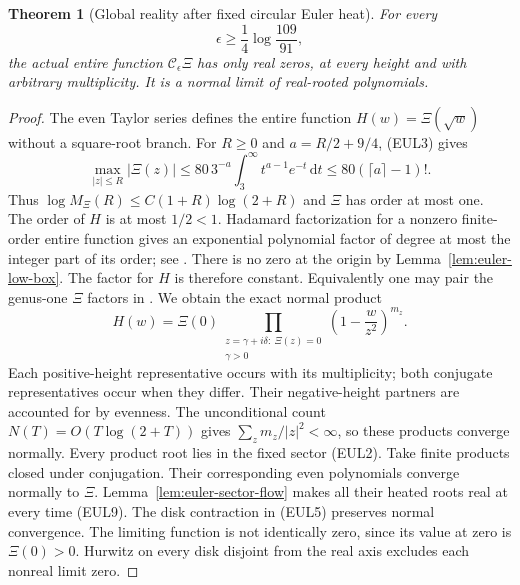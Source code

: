\documentclass[11pt]{article}
\newtheorem{theorem}{Theorem}
\theoremstyle{remark}\newtheorem{remark}[theorem]{Remark}
\newcommand{\dd}{\,\mathrm d}
\begin{document}
\begin{theorem}[Global reality after fixed circular Euler heat]
\label{thm:euler-xi-real}
For every
\[
                  \epsilon\ge\frac14\log\frac{109}{91},  \tag{EUL9}
\]
the actual entire function $\mathcal C_\epsilon\Xi$ has only real
zeros, at every height and with arbitrary multiplicity.
It is a normal limit of real-rooted polynomials.
\end{theorem}
\begin{proof}
The even Taylor series defines the entire function
$H(w)=\Xi(\sqrt w)$ without a square-root branch.
For $R\ge0$ and $a=R/2+9/4$, (EUL3) gives
\[
 \max_{|z|\le R}|\Xi(z)|
 \le80\,3^{-a}\int_3^\infty t^{a-1}e^{-t}\dd t
 \le80(\lceil a\rceil-1)!.
\]
Thus $\log M_\Xi(R)\le C(1+R)\log(2+R)$ and $\Xi$ has
order at most one. The order of $H$ is at most $1/2<1$.
Hadamard factorization for a nonzero finite-order entire function
gives an exponential polynomial factor of degree at most the
integer part of its order; see \cite[theorem (1), p.~1]{ElkiesHadamard}.
There is no zero at the origin by Lemma~\ref{lem:euler-low-box}.
The factor for $H$ is therefore constant. Equivalently one may pair
the genus-one $\Xi$ factors in \cite[Theorem 7.7, p.~58]{Petrow}.
We obtain the exact normal product
\[
 H(w)=\Xi(0)\prod_{\substack{z=\gamma+i\delta:\ \Xi(z)=0\\
                          \gamma>0}}
                  \left(1-\frac{w}{z^2}\right)^{m_z}.    \tag{EUL10}
\]
Each positive-height representative occurs with its multiplicity;
both conjugate representatives occur when they differ.
Their negative-height partners are accounted for by evenness.
The unconditional count $N(T)=O(T\log(2+T))$ gives
$\sum_zm_z/|z|^2<\infty$, so these products converge normally.
Every product root lies in the fixed sector (EUL2).
Take finite products closed under conjugation. Their corresponding
even polynomials converge normally to $\Xi$.
Lemma~\ref{lem:euler-sector-flow} makes all their heated roots
real at every time (EUL9).
The disk contraction in (EUL5) preserves normal convergence.
The limiting function is not identically zero, since its value
at zero is $\Xi(0)>0$. Hurwitz on every disk disjoint from the
real axis excludes each nonreal limit zero.
\end{proof}
\end{document}
